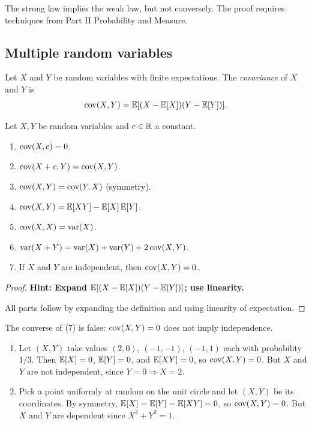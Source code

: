 \documentclass[a4paper]{article}
\begin{document}
\begin{remark}
  The strong law implies the weak law, but not conversely. The proof requires techniques from Part II Probability and Measure.
\end{remark}


\subsection{Multiple random variables}

\begin{defi}[Covariance]
  Let $X$ and $Y$ be random variables with finite expectations. The \emph{covariance} of $X$ and $Y$ is
  \[
    \operatorname{cov}(X, Y) = \mathbb{E}[(X - \mathbb{E}[X])(Y - \mathbb{E}[Y])].
  \]
\end{defi}

\begin{prop}
  Let $X, Y$ be random variables and $c \in \mathbb{R}$ a constant.
  \begin{enumerate}
    \item $\operatorname{cov}(X, c) = 0$.
    \item $\operatorname{cov}(X + c, Y) = \operatorname{cov} (X, Y)$.
    \item $\operatorname{cov} (X, Y) = \operatorname{cov} (Y, X)$ (symmetry).
    \item $\operatorname{cov} (X, Y) = \mathbb{E}[XY] - \mathbb{E}[X]\,\mathbb{E}[Y]$.
    \item $\operatorname{cov} (X, X) = \operatorname{var} (X)$.
    \item $\operatorname{var} (X + Y) = \operatorname{var} (X) + \operatorname{var} (Y) + 2\operatorname{cov} (X, Y)$.
    \item If $X$ and $Y$ are independent, then $\operatorname{cov}(X, Y) = 0$.
  \end{enumerate}
\end{prop}

\begin{proof}
  \textbf{Hint: Expand $\mathbb{E}[(X - \mathbb{E}[X])(Y - \mathbb{E}[Y])]$; use linearity.}

  All parts follow by expanding the definition and using linearity of expectation.
\end{proof}

\begin{remark}
  The converse of (7) is false: $\operatorname{cov}(X, Y) = 0$ does not imply independence.
\end{remark}

\begin{eg}
  \begin{enumerate}
    \item Let $(X, Y)$ take values $(2, 0)$, $(-1, -1)$, $(-1, 1)$ each with probability $1/3$. Then $\mathbb{E}[X] = 0$, $\mathbb{E}[Y] = 0$, and $\mathbb{E}[XY] = 0$, so $\operatorname{cov}(X, Y) = 0$. But $X$ and $Y$ are not independent, since $Y = 0 \Rightarrow X = 2$.
    \item Pick a point uniformly at random on the unit circle and let $(X, Y)$ be its coordinates. By symmetry, $\mathbb{E}[X] = \mathbb{E}[Y] = \mathbb{E}[XY] = 0$, so $\operatorname{cov}(X, Y) = 0$. But $X$ and $Y$ are dependent since $X^2 + Y^2 = 1$.
  \end{enumerate}
\end{eg}
\end{document}
